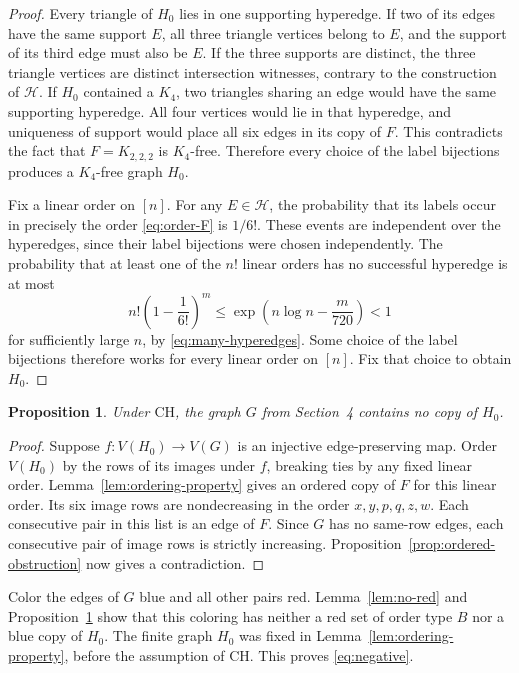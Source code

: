 \documentclass[10pt,letterpaper,leqno]{amsart}
\numberwithin{equation}{section}
\newtheorem{proposition}[theorem]{Proposition}
\theoremstyle{definition}
\theoremstyle{remark}
\newcommand{\CH}{\mathrm{CH}}
\begin{document}
\begin{proof}
Every triangle of $H_0$ lies in one supporting hyperedge.
If two of its edges have the same support $E$, all three triangle
vertices belong to $E$, and the support of its third edge must also be
$E$. If the three supports are distinct, the three triangle vertices
are distinct intersection witnesses, contrary to the construction of
$\mathcal H$.
If $H_0$ contained a $K_4$, two triangles sharing an edge would have the
same supporting hyperedge. All four vertices would lie in that
hyperedge, and uniqueness of support would place all six edges in its
copy of $F$. This contradicts the fact that $F=K_{2,2,2}$ is $K_4$-free.
Therefore every choice of the label bijections produces a $K_4$-free
graph $H_0$.

Fix a linear order on $[n]$. For any $E\in\mathcal H$, the probability
that its labels occur in precisely the order \eqref{eq:order-F} is
$1/6!$. These events are independent over the hyperedges, since their
label bijections were chosen independently. The probability that at
least one of the $n!$ linear orders has no successful hyperedge is at most
\begin{equation}\label{eq:union-bound}
 n!\left(1-\frac1{6!}\right)^m
 \le \exp\left(n\log n-\frac{m}{720}\right)<1
\end{equation}
for sufficiently large $n$, by \eqref{eq:many-hyperedges}.
Some choice of the label bijections therefore works for every linear
order on $[n]$. Fix that choice to obtain $H_0$.
\end{proof}

\begin{proposition}\label{prop:no-finite-copy}
Under $\CH$, the graph $G$ from Section~4 contains no copy of $H_0$.
\end{proposition}

\begin{proof}
Suppose $f\colon V(H_0)\to V(G)$ is an injective edge-preserving map.
Order $V(H_0)$ by the rows of its images under $f$, breaking ties by
any fixed linear order. Lemma~\ref{lem:ordering-property} gives an
ordered copy of $F$ for this linear order.
Its six image rows are nondecreasing in the order
$x,y,p,q,z,w$. Each consecutive pair in this list is an edge of $F$.
Since $G$ has no same-row edges, each consecutive pair of image rows
is strictly increasing. Proposition~\ref{prop:ordered-obstruction}
now gives a contradiction.
\end{proof}

Color the edges of $G$ blue and all other pairs red.
Lemma~\ref{lem:no-red} and Proposition~\ref{prop:no-finite-copy}
show that this coloring has neither a red set of order type $B$ nor a
blue copy of $H_0$. The finite graph $H_0$ was fixed in
Lemma~\ref{lem:ordering-property}, before the assumption of $\CH$.
This proves \eqref{eq:negative}.
\end{document}
